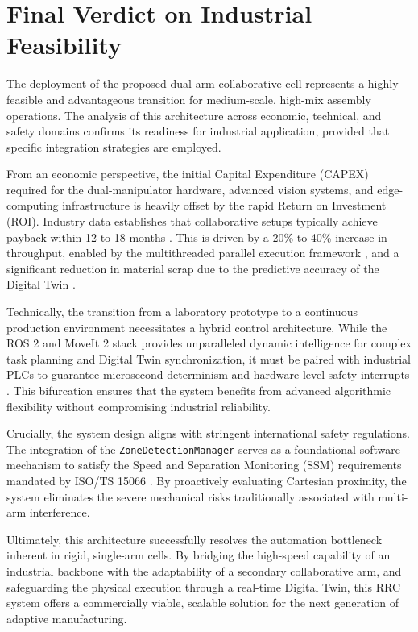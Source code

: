 \section{Final Verdict on Industrial Feasibility}

The deployment of the proposed dual-arm collaborative cell represents a highly feasible and advantageous transition for medium-scale, high-mix assembly operations. The analysis of this architecture across economic, technical, and safety domains confirms its readiness for industrial application, provided that specific integration strategies are employed.

From an economic perspective, the initial Capital Expenditure (CAPEX) required for the dual-manipulator hardware, advanced vision systems, and edge-computing infrastructure is heavily offset by the rapid Return on Investment (ROI). Industry data establishes that collaborative setups typically achieve payback within 12 to 18 months \cite{ifactory2026calculator, mantec2026cobot}. This is driven by a 20\% to 40\% increase in throughput, enabled by the multithreaded parallel execution framework \cite{szghtech2026cobot}, and a significant reduction in material scrap due to the predictive accuracy of the Digital Twin \cite{iotforall2026digitaltwin}.

Technically, the transition from a laboratory prototype to a continuous production environment necessitates a hybrid control architecture. While the ROS 2 and MoveIt 2 stack provides unparalleled dynamic intelligence for complex task planning and Digital Twin synchronization, it must be paired with industrial PLCs to guarantee microsecond determinism and hardware-level safety interrupts \cite{mdpi2026interoperability}. This bifurcation ensures that the system benefits from advanced algorithmic flexibility without compromising industrial reliability.

Crucially, the system design aligns with stringent international safety regulations. The integration of the \texttt{ZoneDetectionManager} serves as a foundational software mechanism to satisfy the Speed and Separation Monitoring (SSM) requirements mandated by ISO/TS 15066 \cite{iso15066, nist2016ssm}. By proactively evaluating Cartesian proximity, the system eliminates the severe mechanical risks traditionally associated with multi-arm interference.

Ultimately, this architecture successfully resolves the automation bottleneck inherent in rigid, single-arm cells. By bridging the high-speed capability of an industrial backbone with the adaptability of a secondary collaborative arm, and safeguarding the physical execution through a real-time Digital Twin, this RRC system offers a commercially viable, scalable solution for the next generation of adaptive manufacturing.